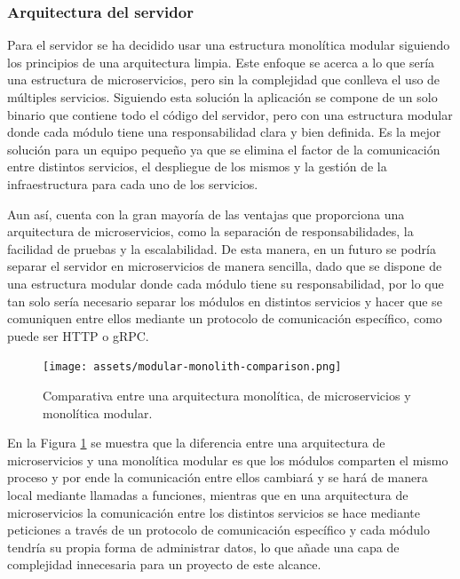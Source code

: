 \subsubsection{Arquitectura del servidor}
Para el servidor se ha decidido usar una estructura monolítica modular siguiendo los principios de una arquitectura limpia.
Este enfoque se acerca a lo que sería una estructura de microservicios, pero sin la complejidad que conlleva el uso de múltiples servicios.
Siguiendo esta solución la aplicación se compone de un solo binario que contiene todo el código del servidor, pero con una estructura modular donde cada módulo tiene una responsabilidad clara y bien definida.
Es la mejor solución para un equipo pequeño ya que se elimina el factor de la comunicación entre distintos servicios, el despliegue de los mismos y la gestión de la infraestructura para cada uno de los servicios.

Aun así, cuenta con la gran mayoría de las ventajas que proporciona una arquitectura de microservicios, como la separación de responsabilidades, la facilidad de pruebas y la escalabilidad.
De esta manera, en un futuro se podría separar el servidor en microservicios de manera sencilla, dado que se dispone de una estructura modular donde cada módulo tiene su responsabilidad, por lo que tan solo sería necesario separar los módulos en distintos servicios y hacer que se comuniquen entre ellos mediante un protocolo de comunicación específico, como puede ser HTTP o gRPC.


\begin{figure}[H]
  \centering
  \texttt{[image: assets/modular-monolith-comparison.png]}
  \caption{Comparativa entre una arquitectura monolítica, de microservicios y monolítica modular. \parencite{tsechelidis2023modular}}
  \label{fig:modular-monolith-comparison}
\end{figure}

En la Figura \ref{fig:modular-monolith-comparison} se muestra que la diferencia entre una arquitectura de microservicios y una monolítica modular es que los módulos comparten el mismo proceso y por ende la comunicación entre ellos cambiará y se hará de manera local mediante llamadas a funciones, mientras que en una arquitectura de microservicios la comunicación entre los distintos servicios se hace mediante peticiones a través de un protocolo de comunicación específico y cada módulo tendría su propia forma de administrar datos, lo que añade una capa de complejidad innecesaria para un proyecto de este alcance.


